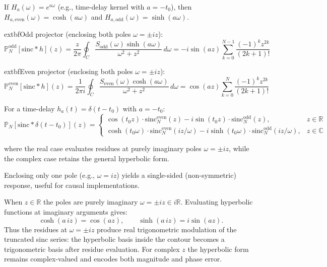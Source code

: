 \begin{corollary}
If $H_a(\omega) = e^{a\omega}$ (e.g., time-delay kernel with $a = -t_0$), then
\(H_{a,\text{even}}(\omega)=\cosh(a\omega)\) and \(H_{a,\text{odd}}(\omega)=\sinh(a\omega)\).

	extbf{Odd projector} (enclosing both poles $\omega=\pm iz$):
\[
\mathbb{P}_N^{\text{odd}}[\text{sinc} * h](z)=\frac{z}{2\pi}\oint_C \frac{S_{\text{odd}}(\omega)\sinh(a\omega)}{\omega^2+z^2}\,d\omega
= -i\sin(az)\sum_{k=0}^{N-1}\frac{(-1)^k z^{2k}}{(2k+1)!}
\]

	extbf{Even projector} (enclosing both poles $\omega=\pm iz$):
\[
\mathbb{P}_N^{\text{even}}[\text{sinc} * h](z)=\frac{1}{2\pi i}\oint_C \frac{S_{\text{even}}(\omega)\cosh(a\omega)}{\omega^2+z^2}\,d\omega
= \cos(az)\sum_{k=0}^{N}\frac{(-1)^k z^{2k}}{(2k+1)!}
\]

For a time-delay $h_a(t)=\delta(t-t_0)$ with $a=-t_0$:
\[
\boxed{
\mathbb{P}_N[\text{sinc} * \delta(t-t_0)](z)=
\begin{cases}
\cos(t_0 z)\cdot\text{sinc}_N^{\text{even}}(z)-i\sin(t_0 z)\cdot\text{sinc}_N^{\text{odd}}(z), & z \in \mathbb{R}\\[0.5em]
\cosh(t_0 \omega)\cdot\text{sinc}_N^{\text{even}}(iz/\omega)-i\sinh(t_0 \omega)\cdot\text{sinc}_N^{\text{odd}}(iz/\omega), & z \in \mathbb{C}
\end{cases}
}
\]

where the real case evaluates residues at purely imaginary poles $\omega=\pm iz$, while the complex case retains the general hyperbolic form.

Enclosing only one pole (e.g., $\omega=iz$) yields a single-sided (non-symmetric) response, useful for causal implementations.
\end{corollary}\label{eq:kern_propto_e}

\begin{remark}
When $z\in\mathbb{R}$ the poles are purely imaginary $\omega=\pm iz\in i\mathbb{R}$. Evaluating hyperbolic functions at imaginary arguments gives:
\[
\cosh(a\,i z)=\cos(a z),\qquad \sinh(a\,i z)=i\sin(a z).
\]
Thus the residues at $\omega=\pm iz$ produce real trigonometric modulation of the truncated sinc series: the hyperbolic basis inside the contour becomes a trigonometric basis after residue evaluation. For complex $z$ the hyperbolic form remains complex-valued and encodes both magnitude and phase error.
\end{remark}

